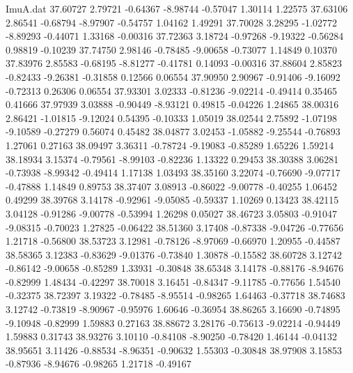 \begin{filecontents}{ImuA.dat}
  37.60727    2.79721   -0.64367   -8.98744   -0.57047    1.30114    1.22575
  37.63106    2.86541   -0.68794   -8.97907   -0.54757    1.04162    1.49291
  37.70028    3.28295   -1.02772   -8.89293   -0.44071    1.33168   -0.00316
  37.72363    3.18724   -0.97268   -9.19322   -0.56284    0.98819   -0.10239
  37.74750    2.98146   -0.78485   -9.00658   -0.73077    1.14849    0.10370
  37.83976    2.85583   -0.68195   -8.81277   -0.41781    0.14093   -0.00316
  37.88604    2.85823   -0.82433   -9.26381   -0.31858    0.12566    0.06554
  37.90950    2.90967   -0.91406   -9.16092   -0.72313    0.26306    0.06554
  37.93301    3.02333   -0.81236   -9.02214   -0.49414    0.35465    0.41666
  37.97939    3.03888   -0.90449   -8.93121    0.49815   -0.04226    1.24865
  38.00316    2.86421   -1.01815   -9.12024    0.54395   -0.10333    1.05019
  38.02544    2.75892   -1.07198   -9.10589   -0.27279    0.56074    0.45482
  38.04877    3.02453   -1.05882   -9.25544   -0.76893    1.27061    0.27163
  38.09497    3.36311   -0.78724   -9.19083   -0.85289    1.65226    1.59214
  38.18934    3.15374   -0.79561   -8.99103   -0.82236    1.13322    0.29453
  38.30388    3.06281   -0.73938   -8.99342   -0.49414    1.17138    1.03493
  38.35160    3.22074   -0.76690   -9.07717   -0.47888    1.14849    0.89753
  38.37407    3.08913   -0.86022   -9.00778   -0.40255    1.06452    0.49299
  38.39768    3.14178   -0.92961   -9.05085   -0.59337    1.10269    0.13423
  38.42115    3.04128   -0.91286   -9.00778   -0.53994    1.26298    0.05027
  38.46723    3.05803   -0.91047   -9.08315   -0.70023    1.27825   -0.06422
  38.51360    3.17408   -0.87338   -9.04726   -0.77656    1.21718   -0.56800
  38.53723    3.12981   -0.78126   -8.97069   -0.66970    1.20955   -0.44587
  38.58365    3.12383   -0.83629   -9.01376   -0.73840    1.30878   -0.15582
  38.60728    3.12742   -0.86142   -9.00658   -0.85289    1.33931   -0.30848
  38.65348    3.14178   -0.88176   -8.94676   -0.82999    1.48434   -0.42297
  38.70018    3.16451   -0.84347   -9.11785   -0.77656    1.54540   -0.32375
  38.72397    3.19322   -0.78485   -8.95514   -0.98265    1.64463   -0.37718
  38.74683    3.12742   -0.73819   -8.90967   -0.95976    1.60646   -0.36954
  38.86265    3.16690   -0.74895   -9.10948   -0.82999    1.59883    0.27163
  38.88672    3.28176   -0.75613   -9.02214   -0.94449    1.59883    0.31743
  38.93276    3.10110   -0.84108   -8.90250   -0.78420    1.46144   -0.04132
  38.95651    3.11426   -0.88534   -8.96351   -0.90632    1.55303   -0.30848
  38.97908    3.15853   -0.87936   -8.94676   -0.98265    1.21718   -0.49167

\end{filecontents}
